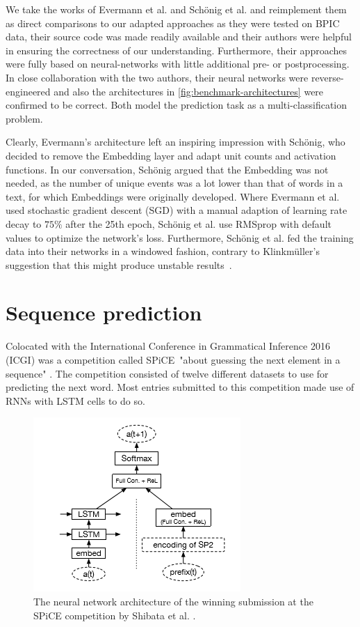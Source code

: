 We take the works of Evermann et al. and Schönig et al. and reimplement them as direct comparisons to our adapted approaches as they were tested on BPIC data, their source code was made readily available and their authors were helpful in ensuring the correctness of our understanding. Furthermore, their approaches were fully based on neural-networks with little additional pre- or postprocessing. In close collaboration with the two authors, their neural networks were reverse-engineered and also the architectures in \autoref{fig:benchmark-architectures} were confirmed to be correct. Both model the prediction task as a multi-classification problem.

Clearly, Evermann's architecture left an inspiring impression with Schönig, who decided to remove the Embedding layer and adapt unit counts and activation functions. In our conversation, Schönig argued that the Embedding was not needed, as the number of unique events was a lot lower than that of words in a text, for which Embeddings were originally developed. Where Evermann et al. used stochastic gradient descent (SGD) with a manual adaption of learning rate decay to $75\%$ after the 25th epoch, Schönig et al. use RMSprop with default values to optimize the network's loss. Furthermore, Schönig et al. fed the training data into their networks in a windowed fashion, contrary to Klinkmüller's suggestion that this might produce unstable results~\cite{klinkmuller2018reliablemonitoring}.

\section{Sequence prediction}
\label{sec:related-work-sequence-prediction}
Colocated with the International Conference in Grammatical Inference 2016 (ICGI) was a competition called SPiCE\ "about guessing the next element in a sequence" \cite{web:spice}. The competition consisted of twelve different datasets to use for predicting the next word. Most entries submitted to this competition made use of RNNs with LSTM cells to do so.\\

\begin{figure}
    \centering
    \includegraphics[height=.4\textwidth]{gfx/spice-winner-architecture.png}
    \caption{The neural network architecture of the winning submission at the SPiCE competition by Shibata et al. \cite{shibata2016bipartite}.}
    \label{fig:spice-winner-architecture}
\end{figure}

